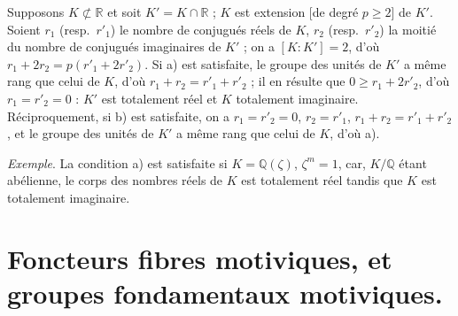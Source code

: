 \documentclass[11pt,a4paper]{article}
\begin{document}
Supposons $K \not\subset \mathbb{R}$ et soit $K' = K \cap \mathbb{R}$ ; $K$
est extension  [de degré $p \geq 2$] de $K'$. Soient
$r_{1}$ (resp.\ $r'_{1}$) le nombre de conjugués réels de $K$, $r_{2}$
(resp.\ $r'_{2}$) la moitié du nombre de conjugués imaginaires de $K'$ ; on
a $[K : K'] = 2$, d'où $r_{1} + 2r_{2} = p(r'_{1} + 2r'_{2})$. Si a) est
satisfaite, le groupe des unités de $K'$ a même rang que celui de $K$, d'où
\struck{\ill{}} $r_{1} + r_{2} = r'_{1} + r'_{2}$ ; il en résulte que $0
\geq r_{1} + 2r'_{2}$, d'où $r_{1} = r'_{2} = 0$ : $K'$ est totalement réel
et $K$ totalement imaginaire. Réciproquement, si b) est satisfaite, on a
$r_{1} = r'_{2} = 0$, $r_{2} = r'_{1}$, $r_{1} + r_{2} = r'_{1} + r'_{2}$,
et le groupe des unités de $K'$ a même rang que celui de $K$, d'où a).


\emph{Exemple}. La condition a) est satisfaite si $K = \mathbb{Q}(\zeta)$,
$\zeta^{m} = 1$, car, $K/\mathbb{Q}$ étant abélienne, le corps des nombres
réels de $K$ est totalement réel tandis que $K$ est totalement imaginaire.

\section{Foncteurs fibres motiviques, et groupes fondamentaux motiviques.}

\end{document}
